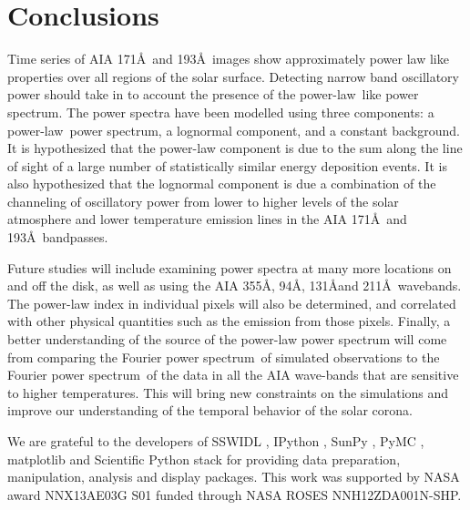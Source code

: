 \documentclass[onecolumn]{emulateapj}
\newcommand{\PS}{power spectrum}
\newcommand{\PL}{power-law}
\newcommand{\Fps}{Fourier \PS}
\begin{document}
\section{Conclusions}\label{sec:conc}

Time series of AIA 171\AA\ and 193\AA\ images show approximately power
law like properties over all regions of the solar surface.  Detecting
narrow band oscillatory power should take in to account the presence
of the \PL\ like \PS.  The power spectra have been modelled using
three components: a \PL\ \PS, a lognormal component, and a constant
background.  It is hypothesized that the power-law component is due to
the sum along the line of sight of a large number of statistically
similar energy deposition events.  It is also hypothesized that the
lognormal component is due a combination of the channeling of
oscillatory power from lower to higher levels of the solar atmosphere
and lower temperature emission lines in the AIA 171\AA\ and
193\AA\ bandpasses.

Future studies will include examining power spectra at many more
locations on and off the disk, as well as using the AIA 355\AA, 94\AA,
131\AA and 211\AA\ wavebands.  The power-law index in individual
pixels will also be determined, and correlated with other physical
quantities such as the emission from those pixels.  Finally, a better
understanding of the source of the power-law power spectrum will come
from comparing the \Fps\ of simulated observations to the \Fps\ of the
data in all the AIA wave-bands that are sensitive to higher
temperatures.  This will bring new constraints on the simulations and
improve our understanding of the temporal behavior of the solar
corona.




\acknowledgments

We are grateful to the developers of SSWIDL
\citep{1998SoPh..182..497F}, IPython \citep{ipython}, SunPy
\citep{mumford-proc-scipy-2013}, PyMC
\citep{Patil:Huard:Fonnesbeck:2010:JSSOBK:v35i04}, matplotlib
\citep{Hunter:2007} and Scientific Python stack for providing data
preparation, manipulation, analysis and display packages.  This work
was supported by NASA award NNX13AE03G S01 funded through NASA ROSES
NNH12ZDA001N-SHP.
\end{document}
